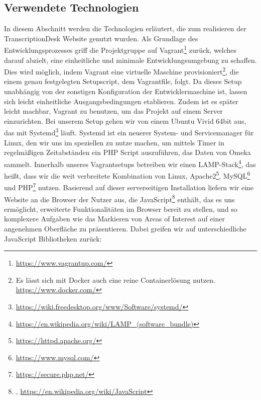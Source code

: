 \documentclass{article}
\begin{document}
\subsection{Verwendete Technologien}
In diesem Abschnitt werden die Technologien erläutert,
die zum realisieren der TranscriptionDesk Website genutzt wurden.
Als Grundlage des Entwicklungsprozesses griff die Projektgruppe auf Vagrant\footnote{
    \url{https://www.vagrantup.com/}}
zurück, welches darauf abzielt, eine einheitliche und minimale Entwicklungsumgebung zu schaffen.
Dies wird möglich, indem Vagrant eine virtuelle Maschine provisioniert\footnote{
    Es lässt sich mit Docker auch eine reine Containerlösung nutzen.\\
    \url{https://www.docker.com/}},
die einem genau festgelegten Setupscript, dem Vagrantfile, folgt.
Da dieses Setup unabhängig von der sonstigen Konfiguration der Entwicklermaschine ist,
lassen sich leicht einheitliche Ausgangsbedingungen etablieren.
Zudem ist es später leicht machbar, Vagrant zu benutzen,
um das Projekt auf einem Server einzurichten.
Bei unserem Setup gehen wir von einem Ubuntu Vivid 64bit aus,
das mit Systemd\footnote{
    \url{https://wiki.freedesktop.org/www/Software/systemd/}}
läuft. Systemd ist ein neuerer System- und Servicemanager für Linux,
den wir uns im speziellen zu nutze machen,
um mittels Timer in regelmäßigen Zeitabständen
ein PHP Script auszuführen, das Daten von Omeka sammelt.
Innerhalb unseres Vagrantsetups betreiben wir einen LAMP-Stack\footnote{\url{https://en.wikipedia.org/wiki/LAMP_(software_bundle)}},
das heißt, dass wir die weit verbreitete Kombination von Linux, Apache2\footnote{
    \url{https://httpd.apache.org/}}, MySQL\footnote{
    \url{https://www.mysql.com/}} und PHP\footnote{
    \url{https://secure.php.net/}} nutzen.
Basierend auf dieser serverseitigen Installation liefern wir eine Website an die Browser der Nutzer aus,
die JavaScript\footnote{
    \cite{Flanagan},
    \url{https://en.wikipedia.org/wiki/JavaScript}} enthält, das es uns ermöglicht,
erweiterte Funktionalitäten im Browser bereit zu stellen,
und so komplexere Aufgaben wie das Markieren von Areas of Interest
auf einer angenehmen Oberfläche zu präsentieren.
Dabei greifen wir auf unterschiedliche JavaScript Bibliotheken zurück:
\end{document}
